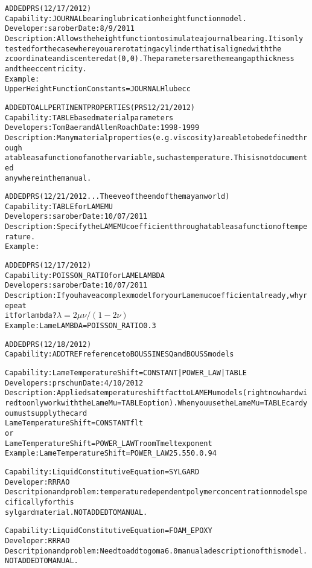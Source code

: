 \documentclass{article}
\begin{document}
\begin{alltt}
ADDED PRS (12/17/2012)
Capability:  JOURNAL bearing lubrication height function model.
Developer:  sarober  Date:  8/9/2011
Description:  Allows the height function to simulate a journal bearing.  It is only 
  tested for the case where you are rotating a cylinder that is aligned with the 
  z coordinate and is centered at (0,0).  The parameters are the mean gap thickness 
  and the eccentricity.  
Example:
  Upper Height Function Constants = JOURNAL {Hlub} {ecc}

ADDED TO ALL PERTINENT PROPERTIES (PRS 12/21/2012)
Capability:  TABLE based material parameters
Developers: Tom Baer and Allen Roach  Date:  1998-1999
Description:  Many material properties (e.g. viscosity) are able to be defined through
  a table as a function of another variable, such as temperature.  This is not documented 
  anywhere in the manual.

ADDED PRS (12/21/2012...The eve of the end of the mayan world)
Capability:  TABLE for LAME MU
Developers:  sarober  Date:  10/07/2011
Description:  Specify the LAME MU coefficient through a table as a function of temperature.
Example:  

ADDED PRS (12/17/2012)
Capability:  POISSON_RATIO for LAME LAMBDA
Developers:  sarober  Date:  10/07/2011
Description: If you have a complex model for your Lame mu coefficient already, why repeat 
  it for lambda?  \(\lambda=2\mu\nu/(1-2\nu)\)
Example:  Lame LAMBDA = POISSON_RATIO 0.3

ADDED PRS (12/18/2012)
Capability: ADD TREF reference to BOUSSINESQ and BOUSS models 

Capability:  Lame Temperature Shift = {CONSTANT | POWER_LAW | TABLE}
Developers: prschun  Date: 4/10/2012
Description: Applieds a temperature shift fact to LAME Mu models (right now hardwired to only work with the Lame Mu = TABLE option).   When you use the Lame Mu = TABLE card you must supply the card
	Lame Temperature Shift = CONSTANT {flt}
or
        Lame Temperature Shift = POWER_LAW {Troom} {Tmelt} {exponent}
Example: Lame Temperature Shift = POWER_LAW 25. 550. 0.94

Capability:  Liquid Constitutive Equation = SYLGARD
Developer: RRRAO
Descritpion and problem: temperature dependent polymer concentration model specifically for this
sylgard material.    NOT ADDED TO MANUAL.    

Capability:  Liquid Constitutive Equation = FOAM_EPOXY
Developer: RRRAO
Descritpion and problem: Need to add to goma6.0 manual a description of this model. 
    NOT ADDED TO MANUAL.    


\end{alltt}
\end{document}
